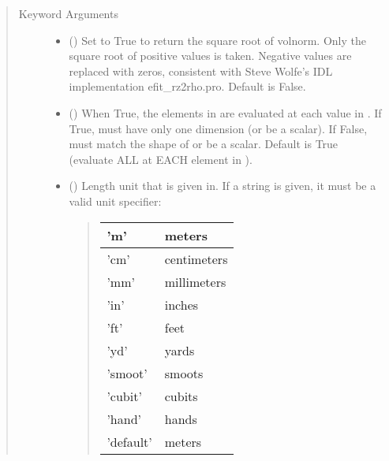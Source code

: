 \documentclass[letterpaper,10pt,english]{sphinxmanual}
\begin{document}
\begin{fulllineitems}
\begin{fulllineitems}
\begin{quote}
\begin{description}
\begin{itemize}
\end{itemize}

\item[{Keyword Arguments}] \leavevmode\begin{itemize}
\item {} 
 () \textendash{} Set to True to return the square root of volnorm.
Only the square root of positive values is taken. Negative
values are replaced with zeros, consistent with Steve Wolfe’s
IDL implementation efit\_rz2rho.pro. Default is False.

\item {} 
 () \textendash{} When True, the elements in  are evaluated
at each value in . If True,  must have only one dimension
(or be a scalar). If False,  must match the shape of 
or be a scalar. Default is True (evaluate ALL  at EACH
element in ).

\item {} 
 () \textendash{} 
Length unit that  is given in.
If a string is given, it must be a valid unit specifier:
\begin{quote}


\begin{savenotes}\sphinxattablestart
\centering
\begin{tabulary}{\linewidth}[t]{|T|T|}
\hline

’m’
&
meters
\\
\hline
’cm’
&
centimeters
\\
\hline
’mm’
&
millimeters
\\
\hline
’in’
&
inches
\\
\hline
’ft’
&
feet
\\
\hline
’yd’
&
yards
\\
\hline
’smoot’
&
smoots
\\
\hline
’cubit’
&
cubits
\\
\hline
’hand’
&
hands
\\
\hline
’default’
&
meters
\\
\hline
\end{tabulary}
\par
\sphinxattableend\end{savenotes}
\end{quote}


\end{itemize}
\end{description}
\end{quote}
\end{fulllineitems}
\end{fulllineitems}
\end{document}
